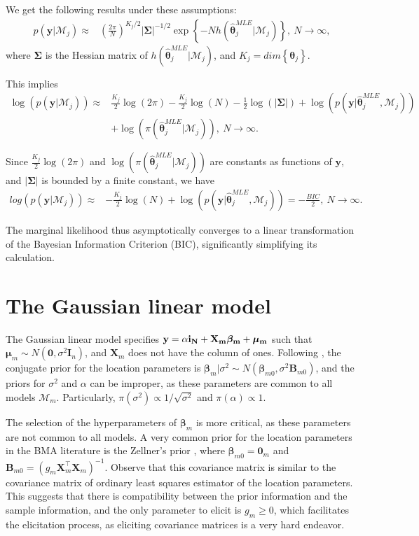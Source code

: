 We get the following results under these assumptions:
\begin{align*}
	p(\bm{y} | \mathcal{M}_j)\approx&\left( \frac{2\pi}{N}\right)^{K_j/2}|\bm{\Sigma}|^{-1/2} \exp\left\{-N h(\bm{\hat{\theta}}_j^{MLE}|\mathcal{M}_j)\right\}, \ N\rightarrow\infty,
\end{align*}
where $\bm{\Sigma}$ is the Hessian matrix of $h(\bm{\hat{\theta}}_j^{MLE}|\mathcal{M}_j)$, and $K_j=dim\left\{\bm{\theta}_j\right\}$.

This implies
\begin{align*}
	\log\left(p(\bm{y} | \mathcal{M}_j)\right)\approx& \frac{K_j}{2}\log(2\pi)- \frac{K_j}{2}\log(N) -\frac{1}{2}\log(|\bm{\Sigma}|) + \log(p(\bm{y}| \bm{\hat{\theta}}_j^{MLE},\mathcal{M}_j))\\
	&+\log(\pi(\bm{\hat{\theta}}_j^{MLE} | \mathcal{M}_j)), \ N\rightarrow\infty.
\end{align*}

Since $\frac{K_j}{2}\log(2\pi)$ and $\log(\pi(\bm{\hat{\theta}}_j^{MLE} | \mathcal{M}_j))$ are constants as functions of $\bm{y}$, and $|\bm{\Sigma}|$ is bounded by a finite constant, we have
\begin{align*}
	log\left(p(\bm{y} | \mathcal{M}_j)\right)\approx& -\frac{K_j}{2}\log(N)+\log(p(\bm{y}| \bm{\hat{\theta}}_j^{MLE},\mathcal{M}_j))= -\frac{BIC}{2}, \ N \rightarrow \infty.
\end{align*}

The marginal likelihood thus asymptotically converges to a linear transformation of the Bayesian Information Criterion (BIC), significantly simplifying its calculation.

\section{The Gaussian linear model}\label{sec10_2}

The Gaussian linear model specifies $\bf{y}=\alpha\bm{i}_N+\bm{X}_m\bm{\beta}_m+\bm{\mu}_m$ such that $\bm{\mu}_m\sim{N}(\bm{0},\sigma^2\bm{I}_n)$, and $\bm{X}_m$ does not have the column of ones. Following \cite{koop2003bayesian}, the conjugate prior for the location parameters is $\bm{\beta}_m|\sigma^2 \sim {N}(\bm{\beta}_{m0}, \sigma^2 \bm{B}_{m0})$, and the priors for $\sigma^2$ and $\alpha$ can be improper, as these parameters are common to all models $\mathcal{M}_m$. Particularly, $\pi(\sigma^2)\propto 1/\sqrt{\sigma^2}$ and $\pi(\alpha)\propto 1$.

The selection of the hyperparameters of $\bm{\beta}_m$ is more critical, as these parameters are not common to all models. A very common prior for the location parameters in the BMA literature is the Zellner's prior \cite{zellner1986assessing}, where $\bm{\beta}_{m0}=\bm{0}_m$ and $\bm{B}_{m0}=(g_m\bm{X}_m^{\top}\bm{X}_m)^{-1}$. Observe that this covariance matrix is similar to the covariance matrix of ordinary least squares estimator of the location parameters. This suggests that there is compatibility between the prior information and the sample information, and the only parameter to elicit is $g_m\geq 0$, which facilitates the elicitation process, as eliciting covariance matrices is a very hard endeavor.

